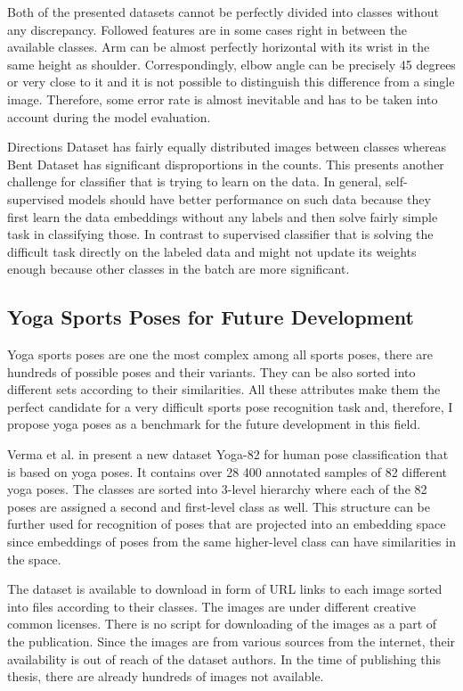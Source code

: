 Both of the presented datasets cannot be perfectly divided into classes without any discrepancy. Followed features are in some cases right in between the available classes. Arm can be almost perfectly horizontal with its wrist in the same height as shoulder. Correspondingly, elbow angle can be precisely 45 degrees or very close to it and it is not possible to distinguish this difference from a single image. Therefore, some error rate is almost inevitable and has to be taken into account during the model evaluation.

Directions Dataset has fairly equally distributed images between classes whereas Bent Dataset has significant disproportions in the counts. This presents another challenge for classifier that is trying to learn on the data. In general, self-supervised models should have better performance on such data because they first learn the data embeddings without any labels and then solve fairly simple task in classifying those. In contrast to supervised classifier that is solving the difficult task directly on the labeled data and might not update its weights enough because other classes in the batch are more significant.

\subsection{Yoga Sports Poses for Future Development}

Yoga sports poses are one the most complex among all sports poses, there are hundreds of possible poses and their variants. They can be also sorted into different sets according to their similarities. All these attributes make them the perfect candidate for a very difficult sports pose recognition task and, therefore, I propose yoga poses as a benchmark for the future development in this field.

Verma et al. in \cite{verma2020yoga} present a new dataset Yoga-82 for human pose classification that is based on yoga poses. It contains over 28 400 annotated samples of 82 different yoga poses. The classes are sorted into 3-level hierarchy where each of the 82 poses are assigned a second and first-level class as well. This structure can be further used for recognition of poses that are projected into an embedding space since embeddings of poses from the same higher-level class can have similarities in the space.

The dataset is available to download in form of URL links to each image sorted into files according to their classes. The images are under different creative common licenses. There is no script for downloading of the images as a part of the publication. Since the images are from various sources from the internet, their availability is out of reach of the dataset authors. In the time of publishing this thesis, there are already hundreds of images not available.

